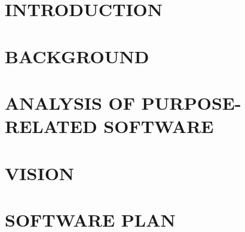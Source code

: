 

\usepackage{listings}
\usepackage{xcolor}
\usepackage{algorithm}
\usepackage{algorithmicx}
\usepackage{algpseudocode}






\lstset{style=sharpc}







\newpage
\tableofcontents
\newpage





\clearpage
\section{INTRODUCTION}


\clearpage
\section{BACKGROUND}


\clearpage
\section{ANALYSIS OF PURPOSE-RELATED SOFTWARE}\label{related}


\clearpage
\section{VISION}


\clearpage
\section{SOFTWARE PLAN}


\clearpage

